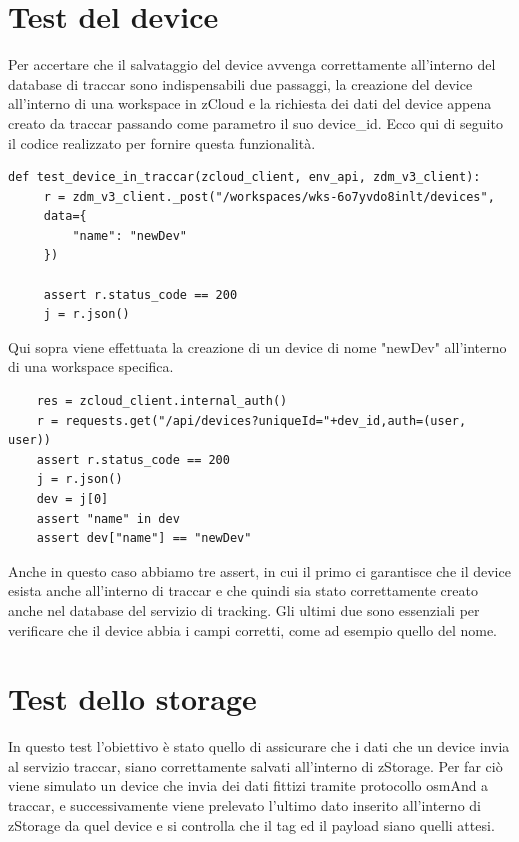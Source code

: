 \documentclass[a4paper,titlepage,12pt]{book}
\begin{document}
{\section{
Test del device}
Per accertare che il salvataggio del device avvenga correttamente all'interno del database di traccar sono indispensabili due passaggi, la creazione del device all'interno di una workspace in zCloud e la richiesta dei dati del device appena creato da traccar passando come parametro il suo device\_id. Ecco qui di seguito il codice realizzato per fornire questa funzionalità.

\begin{verbatim}
def test_device_in_traccar(zcloud_client, env_api, zdm_v3_client):
     r = zdm_v3_client._post("/workspaces/wks-6o7yvdo8inlt/devices",
     data={
         "name": "newDev"
     })
     
     assert r.status_code == 200
     j = r.json()
\end{verbatim}

\noindent Qui sopra viene effettuata la creazione di un device di nome "newDev" all'interno di una workspace specifica.

\begin{verbatim}
    res = zcloud_client.internal_auth()
    r = requests.get("/api/devices?uniqueId="+dev_id,auth=(user, user))
    assert r.status_code == 200
    j = r.json()
    dev = j[0]
    assert "name" in dev
    assert dev["name"] == "newDev" 
\end{verbatim}

\noindent Anche in questo caso abbiamo tre assert, in cui il primo ci garantisce che il device esista anche all'interno di traccar e che quindi sia stato correttamente creato anche nel database del servizio di tracking. Gli ultimi due sono essenziali per verificare che il device abbia i campi corretti, come ad esempio quello del nome.


\section{
Test dello storage}
In questo test l'obiettivo è stato quello di assicurare che i dati che un device invia al servizio traccar, siano correttamente salvati all'interno di zStorage. Per far ciò viene simulato un device che invia dei dati fittizi tramite protocollo osmAnd a traccar, e successivamente viene prelevato l'ultimo dato inserito all'interno di zStorage da quel device e si controlla che il tag ed il payload siano quelli attesi.


}
\end{document}
